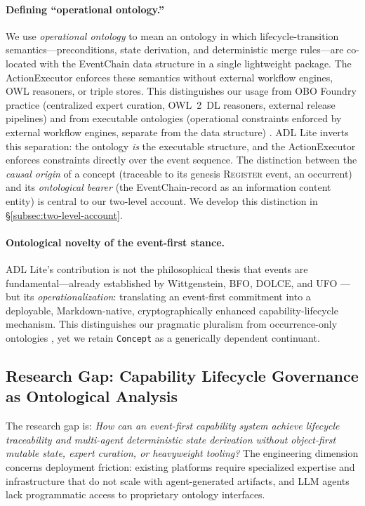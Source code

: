 \paragraph{Defining ``operational ontology.''} We use \emph{operational ontology} to mean an ontology in which lifecycle-transition semantics---preconditions, state derivation, and deterministic merge rules---are co-located with the EventChain data structure in a single lightweight package. The ActionExecutor enforces these semantics without external workflow engines, OWL reasoners, or triple stores. This distinguishes our usage from OBO Foundry practice (centralized expert curation, OWL~2~DL reasoners, external release pipelines) \cite{obo_foundry} and from executable ontologies (operational constraints enforced by external workflow engines, separate from the data structure) \cite{guizzardi2024ufob}. ADL Lite inverts this separation: the ontology \emph{is} the executable structure, and the ActionExecutor enforces constraints directly over the event sequence. The distinction between the \emph{causal origin} of a concept (traceable to its genesis \textsc{Register} event, an occurrent) and its \emph{ontological bearer} (the EventChain-record as an information content entity) is central to our two-level account. We develop this distinction in \S\ref{subsec:two-level-account}.

\paragraph{Ontological novelty of the event-first stance.} ADL Lite's contribution is not the philosophical thesis that events are fundamental---already established by Wittgenstein, BFO, DOLCE, and UFO \cite{wittgenstein_tractatus,bfo,dolce,ufo}---but its \emph{operationalization}: translating an event-first commitment into a deployable, Markdown-native, cryptographically enhanced capability-lifecycle mechanism. This distinguishes our pragmatic pluralism from occurrence-only ontologies \cite{alfedaghi2024occurrence}, yet we retain \texttt{Concept} as a generically dependent continuant.

\subsection{Research Gap: Capability Lifecycle Governance as Ontological Analysis}\label{subsec:research-gap}

The research gap is: \emph{How can an event-first capability system achieve lifecycle traceability and multi-agent deterministic state derivation without object-first mutable state, expert curation, or heavyweight tooling?} The engineering dimension concerns deployment friction: existing platforms require specialized expertise and infrastructure that do not scale with agent-generated artifacts, and LLM agents lack programmatic access to proprietary ontology interfaces.

